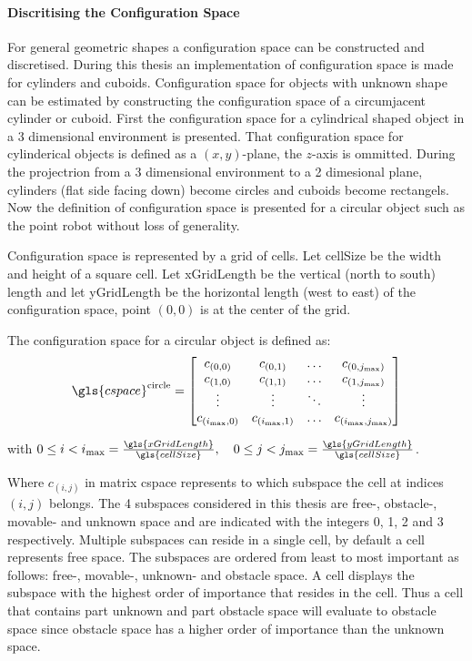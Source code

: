 \paragraph{Discritising the Configuration Space}
For general geometric shapes a configuration space can be constructed and discretised. During this thesis an implementation of configuration space is made for cylinders and cuboids. Configuration space for objects with unknown shape can be estimated by constructing the configuration space of a circumjacent cylinder or cuboid. First the configuration space for a cylindrical shaped object in a 3 dimensional environment is presented. That configuration space for cylinderical objects is defined as a $(x, y)$-plane, the $z$-axis is ommitted. During the projectrion from a 3 dimensional environment to a 2 dimesional plane, cylinders (flat side facing down) become circles and cuboids become rectangels. Now the definition of configuration space is presented for a circular object such as the point robot without loss of generality.\bs

Configuration space is represented by a grid of cells. Let \gls{cellSize} be the width and height of a square cell. Let \gls{xGridLength} be the vertical (north to south) length and let \gls{yGridLength} be the horizontal length (west to east) of the configuration space, point $(0, 0)$ is at the center of the grid.\bs

The configuration space for a circular object is defined as:\bs
\[ \gls{cspace}^{\textrm{circle}} = 
\begin{bmatrix}
  c_{(0,0)} & c_{(0,1)} & \hdots & c_{(0,j_{\textrm{max}})}\\
  c_{(1,0)} & c_{(1,1)} & \hdots & c_{(1,j_{\textrm{max}})}\\
  \vdots &  \vdots & \ddots & \vdots\\
  c_{(i_{\textrm{max}},0)} & c_{(i_{\textrm{max}},1)} & \hdots & c_{(i_{\textrm{max}},j_{\textrm{max}})}\\
\end{bmatrix}
\]

with $0 \leq i < i_{\textrm{max}} = \frac{\gls{xGridLength}}{\gls{cellSize}}, \quad 0 \leq j < j_{\textrm{max}} = \frac{\gls{yGridLength}}{\gls{cellSize}}$.\bs

Where $c_{(i,j)}$ in matrix \gls{cspace} represents to which subspace the cell at indices $(i, j)$ belongs. The 4 subspaces considered in this thesis are free-, obstacle-, movable- and unknown space and are indicated with the integers 0, 1, 2 and 3 respectively. Multiple subspaces can reside in a single cell, by default a cell represents free space. The subspaces are ordered from least to most important as follows: free-, movable-, unknown- and obstacle space. A cell displays the subspace with the highest order of importance that resides in the cell. Thus a cell that contains part unknown and part obstacle space will evaluate to obstacle space since obstacle space has a higher order of importance than the unknown space.\bs

